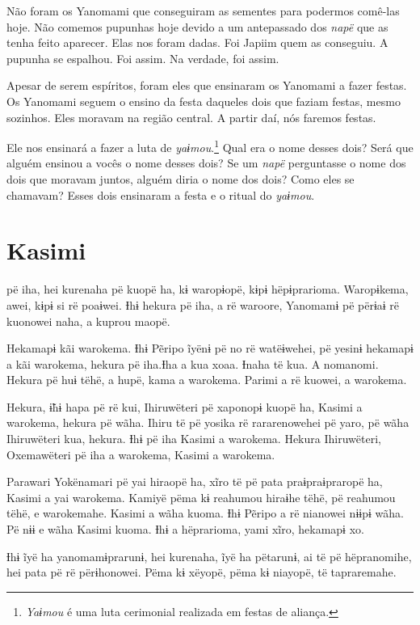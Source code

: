 Não foram os Yanomami que conseguiram as sementes para podermos comê-las
hoje. Não comemos pupunhas hoje devido a um antepassado
dos \textit{napë} que as tenha feito aparecer. Elas nos foram
dadas. Foi Japiim quem as conseguiu. A pupunha se espalhou. Foi
assim. Na verdade, foi assim. 

\enlargethispage{\baselineskip}
Apesar de serem espíritos, foram eles que ensinaram os Yanomami a fazer
festas. Os Yanomami seguem o ensino da festa daqueles dois que faziam
festas, mesmo sozinhos. Eles moravam na região central. A partir daí,
nós faremos festas. 

Ele nos ensinará a fazer a luta de \textit{yaɨmou}.\footnote{\textit{Yaɨmou} é uma luta cerimonial realizada em festas de aliança.} Qual era o nome
desses dois? Será que alguém ensinou a vocês o nome desses dois? Se
um \textit{napë} perguntasse o nome dos dois que moravam juntos, alguém
diria o nome dos dois? Como eles se chamavam? Esses dois
ensinaram a festa e o ritual do \textit{yaɨmou}. 

\chapter{Kasimi}
 
 pë iha, hei kurenaha pë kuopë ha, kɨ waropɨopë, kɨpɨ
hëpɨprarioma. Waropɨkema, awei, kɨpɨ si rë poaɨwei. Ɨhɨ hekura pë iha, a
rë waroore, Yanomamɨ pë përɨaɨ rë kuonowei naha, a kuprou maopë. 

Hekamapɨ kãi warokema. Ɨhɨ Pẽripo ĩyënɨ pë no rë watëɨwehei, pë yesinɨ
hekamapɨ a kãi warokema, hekura pë iha.Ɨha a kua xoaa. Ɨnaha të kua. A nomanomi. Hekura pë huɨ tëhë, a hupë, kama a warokema. Parimi a rë
kuowei, a warokema.

Hekura, ɨ̃hɨ hapa pë rë kui, Ihiruwëteri pë xaponopɨ kuopë ha, Kasimi a
warokema, hekura pë wãha. Ihiru të pë yosika rë rararenowehei pë yaro,
pë wãha Ihiruwëteri kua, hekura. Ɨhɨ pë iha Kasimi a warokema. Hekura
Ihiruwëteri, Oxemawëteri pë iha a warokema, Kasimi a warokema. 

Parawari Yokënamari pë yai hiraopë ha, xĩro të pë pata praɨpraɨpraropë
ha, Kasimi a yai warokema. Kamiyë pëma kɨ reahumou hiraɨhe tëhë, pë
reahumou tëhë, e warokemahe. Kasimi a wãha kuoma. Ɨhɨ Pẽripo a rë
nianowei nɨɨpɨ wãha. Pë nɨɨ e wãha Kasimi kuoma. Ɨhɨ a hëprarioma, yami
xĩro, hekamapɨ xo. 

Ɨhɨ ĩyë ha yanomamɨprarunɨ, hei kurenaha, ĩyë ha pëtarunɨ, ai të pë
hëpranomihe, hei pata pë rë përɨhonowei. Pëma kɨ xëyopë, pëma kɨ
niayopë, të tapraremahe. 

